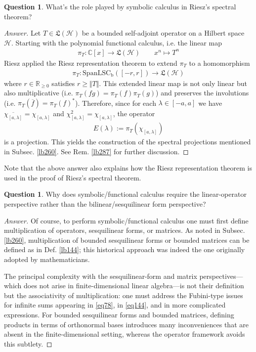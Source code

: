 \documentclass[12pt,b5paper,notitlepage]{article}
\theoremstyle{definition}
\newtheorem{question}[df]{Question}
\theoremstyle{plain}
\newcommand{\fk}{\mathfrak}
\newcommand{\ovl}{\overline}
\newcommand{\Span}{\mathrm{Span}}
\newcommand{\Cbb}{\mathbb C}
\newcommand{\Rbb}{\mathbb R}
\newcommand{\LSCb}{\mathrm{LSC}_{\mathrm b}}
\newcommand{\MH}{\mathcal H}
\numberwithin{equation}{section}
\begin{document}
\begin{question}\label{lb286}
What's the role played by symbolic calculus in Riesz's spectral theorem?
\end{question}

\begin{proof}[Answer]
Let $T\in\fk L(\MH)$ be a bounded self-adjoint operator on a Hilbert space $\MH$. Starting with the polynomial functional calculus, i.e. the linear map
\begin{align*}
\pi_T:\Cbb[x]\rightarrow \fk L(\MH)\qquad x^n\mapsto T^n
\end{align*}
Riesz applied the Riesz representation theorem to extend $\pi_T$ to a homomorphism
\begin{align*}
\pi_T:\Span\LSCb([-r,r])\rightarrow \fk L(\MH)
\end{align*}
where $r\in\Rbb_{\geq0}$ satisfies $r\geq\Vert T\Vert$. This extended linear map is not only linear but also multiplicative (i.e. $\pi_T(fg)=\pi_T(f)\pi_T(g)$) and preserves the involutions (i.e. $\pi_T(\ovl f)=\pi_T(f)^*$). Therefore, since for each $\lambda\in[-a,a]$ we have $\ovl{\chi_{[a,\lambda]}}=\chi_{[a,\lambda]}$ and $\chi_{[a,\lambda]}^2=\chi_{[a,\lambda]}$, the operator
\begin{align*}
E(\lambda):=\pi_T(\chi_{[a,\lambda]})
\end{align*}
is a projection. This yields the construction of the spectral projections mentioned in Subsec. \ref{lb260}. See Rem. \ref{lb287} for further discussion.
\end{proof}


Note that the above answer also explains how the Riesz representation theorem is used in the proof of Riesz's spectral theorem.




\begin{question}
Why does symbolic/functional calculus require the linear-operator perspective rather than the bilinear/sesquilinear form perspective?
\end{question}



\begin{proof}[Answer]
Of course, to perform symbolic/functional calculus one must first define multiplication of operators, sesquilinear forms, or matrices. As noted in Subsec. \ref{lb260}, multiplication of bounded sesquilinear forms or bounded matrices can be defined as in Def. \ref{lb144}; this historical approach was indeed the one originally adopted by mathematicians. 

The principal complexity with the sesquilinear-form and matrix perspectives---which does not arise in finite-dimensional linear algebra---is not their definition but the associativity of multiplication: one must address the Fubini-type issues for infinite sums appearing in \eqref{eq78}, in \eqref{eq144}, and in more complicated expressions. For bounded sesquilinear forms and bounded matrices, defining products in terms of orthonormal bases introduces many inconveniences that are absent in the finite-dimensional setting, whereas the operator framework avoids this subtlety.
\end{proof}
\end{document}
